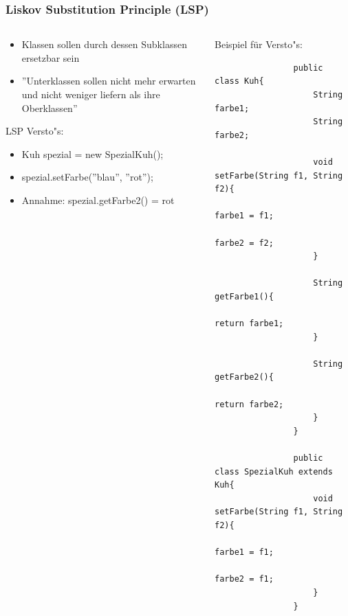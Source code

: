 \begin{frame}[fragile]
	\frametitle{Liskov Substitution Principle (LSP)}
	\begin{columns}
		\begin{column}{0.5\textwidth}
			\small
			\begin{itemize}
			  \item Klassen sollen durch dessen Subklassen ersetzbar sein
			  \item ''Unterklassen sollen nicht mehr erwarten und nicht
			  weniger liefern als ihre Oberklassen''
			\end{itemize}
			
			LSP Versto"s:
			\begin{itemize}
			  \item Kuh spezial = new SpezialKuh();
			  \item spezial.setFarbe(''blau'', ''rot'');
			  \item Annahme: spezial.getFarbe2() = rot
			\end{itemize}
		\end{column}
		\begin{column}{0.5\textwidth}
			\small
			Beispiel f\"ur Versto"s:
			\begin{lstlisting}
				public class Kuh{
					String farbe1;
					String farbe2;
					
					void setFarbe(String f1, String f2){
						farbe1 = f1;
						farbe2 = f2;
					}
					
					String getFarbe1(){
						return farbe1;
					}
					
					String getFarbe2(){
						return farbe2;
					}
				}
				
				public class SpezialKuh extends Kuh{
					void setFarbe(String f1, String f2){
						farbe1 = f1;
						farbe2 = f1;
					}
				}
			\end{lstlisting}
		\end{column}
	\end{columns}
\end{frame} 

